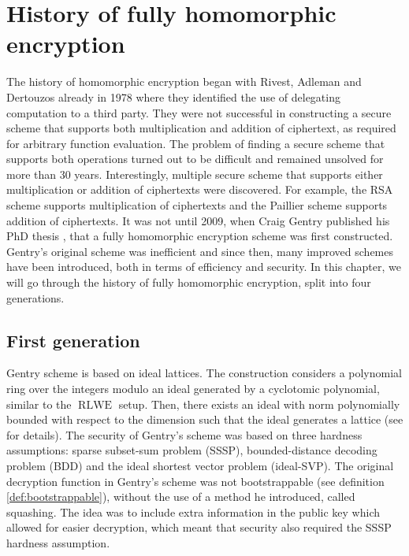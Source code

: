 \chapter{History of fully homomorphic encryption}

The history of homomorphic encryption began with Rivest, Adleman and Dertouzos \cite{rivest1978} already in 1978 where they identified the use of delegating computation to a third party. They were not successful in constructing a secure scheme that supports both multiplication and addition of ciphertext, as required for arbitrary function evaluation. The problem of finding a secure scheme that supports both operations turned out to be difficult and remained unsolved for more than 30 years. Interestingly, multiple secure scheme that supports either multiplication or addition of ciphertexts were discovered. For example, the RSA scheme supports multiplication of ciphertexts and the Paillier scheme supports addition of ciphertexts. It was not until 2009, when Craig Gentry published his PhD thesis \cite{Gentry-Thesis}, that a fully homomorphic encryption scheme was first constructed. Gentry's original scheme was inefficient and since then, many improved schemes have been introduced, both in terms of efficiency and security. In this chapter, we will go through the history of fully homomorphic encryption, split into four generations.

\section{First generation}
Gentry scheme is based on ideal lattices. The construction considers a polynomial ring over the integers modulo an ideal generated by a cyclotomic polynomial, similar to the $\operatorname{RLWE}$ setup. Then, there exists an ideal with norm polynomially bounded with respect to the dimension such that the ideal generates a lattice (see \cite{Gentry-Thesis} for details). The security of Gentry's scheme was based on three hardness assumptions: sparse subset-sum problem (SSSP), bounded-distance decoding problem (BDD) and the ideal shortest vector problem (ideal-SVP). The original decryption function in Gentry's scheme was not bootstrappable (see definition \ref{def:bootstrappable}), without the use of a method he introduced, called squashing. The idea was to include extra information in the public key which allowed for easier decryption, which meant that security also required the SSSP hardness assumption.

